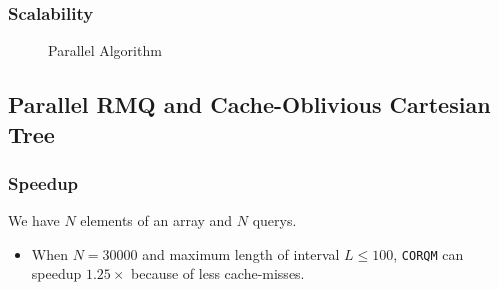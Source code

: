 \begin{frame}
	\frametitle{Scalability}
	\begin{figure}[!ht]
		\centering
		\subfigure[Scalability]{
			
			\label{fig:fig-parallel}
		}
		\caption{Parallel Algorithm}
		\label{fig:light_weight}
	\end{figure}
\end{frame}

\subsection{Parallel RMQ and Cache-Oblivious Cartesian Tree}
\begin{frame}
	\frametitle{Speedup}
	We have $N$ elements of an array and $N$ querys.
	\begin{itemize}
		\setlength\itemsep{1em}
		\item When $N = 30000$ and maximum length of interval $L \le 100$, \texttt{CORQM} can speedup $1.25\times$ 
		because of less cache-misses.
	\end{itemize}
\end{frame}